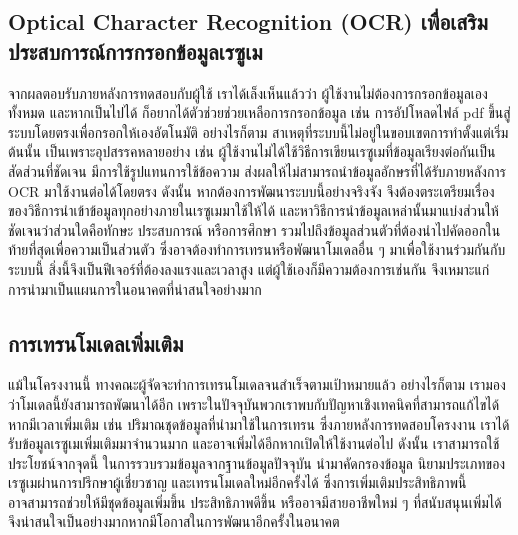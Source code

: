 \subsection{Optical Character Recognition (OCR) เพื่อเสริมประสบการณ์การกรอกข้อมูลเรซูเม}
\par{
    จากผลตอบรับภายหลังการทดสอบกับผู้ใช้ เราได้เล็งเห็นแล้วว่า ผู้ใช้งานไม่ต้องการกรอกข้อมูลเองทั้งหมด และหากเป็นไปได้ ก็อยากได้ตัวช่วยช่วยเหลือการกรอกข้อมูล
    เช่น การอัปโหลดไฟล์ pdf ขึ้นสู่ระบบโดยตรงเพื่อกรอกให้เองอัตโนมัติ อย่างไรก็ตาม สาเหตุที่ระบบนี้ไม่อยู่ในขอบเขตการทำตั้งแต่เริ่มต้นนั้น เป็นเพราะอุปสรรคหลายอย่าง
    เช่น ผู้ใช้งานไม่ได้ใช้วิธีการเขียนเรซูเมที่ข้อมูลเรียงต่อกันเป็นสัดส่วนที่ชัดเจน มีการใช้รูปแทนการใช้ข้อความ ส่งผลให้ไม่สามารถนำข้อมูลอักษรที่ได้รับภายหลังการ OCR มาใช้งานต่อได้โดยตรง
    ดังนั้น หากต้องการพัฒนาระบบนี้อย่างจริงจัง จึงต้องตระเตรียมเรื่องของวิธีการนำเข้าข้อมูลทุกอย่างภายในเรซูเมมาใช้ให้ได้ และหาวิธีการนำข้อมูลเหล่านั้นมาแบ่งส่วนให้ชัดเจนว่าส่วนใดคือทักษะ ประสบการณ์ หรือการศึกษา รวมไปถึงข้อมูลส่วนตัวที่ต้องนำไปคัดออกในท้ายที่สุดเพื่อความเป็นส่วนตัว
    ซึ่งอาจต้องทำการเทรนหรือพัฒนาโมเดลอื่น ๆ มาเพื่อใช้งานร่วมกันกับระบบนี้ สิ่งนี้จึงเป็นฟีเจอร์ที่ต้องลงแรงและเวลาสูง แต่ผู้ใช้เองก็มีความต้องการเช่นกัน จึงเหมาะแก่การนำมาเป็นแผนการในอนาคตที่น่าสนใจอย่างมาก
}

\subsection{การเทรนโมเดลเพิ่มเติม}
\par{
    แม้ในโครงงานนี้ ทางคณะผู้จัดจะทำการเทรนโมเดลจนสำเร็จตามเป้าหมายแล้ว อย่างไรก็ตาม เรามองว่าโมเดลนี้ยังสามารถพัฒนาได้อีก เพราะในปัจจุบันพวกเราพบกับปัญหาเชิงเทคนิคที่สามารถแก้ไขได้หากมีเวลาเพิ่มเติม
    เช่น ปริมาณชุดข้อมูลที่นำมาใช้ในการเทรน ซึ่งภายหลังการทดสอบโครงงาน เราได้รับข้อมูลเรซูเมเพิ่มเติมมาจำนวนมาก และอาจเพิ่มได้อีกหากเปิดให้ใช้งานต่อไป
    ดังนั้น เราสามารถใช้ประโยชน์จากจุดนี้ ในการรวบรวมข้อมูลจากฐานข้อมูลปัจจุบัน นำมาคัดกรองข้อมูล นิยามประเภทของเรซูเมผ่านการปรึกษาผู้เชี่ยวชาญ 
    และเทรนโมเดลใหม่อีกครั้งได้ ซึ่งการเพิ่มเติมประสิทธิภาพนี้ อาจสามารถช่วยให้มีชุดข้อมูลเพิ่มขึ้น ประสิทธิภาพดีขึ้น หรืออาจมีสายอาชีพใหม่ ๆ ที่สนับสนุนเพิ่มได้
    จึงน่าสนใจเป็นอย่างมากหากมีโอกาสในการพัฒนาอีกครั้งในอนาคต
}